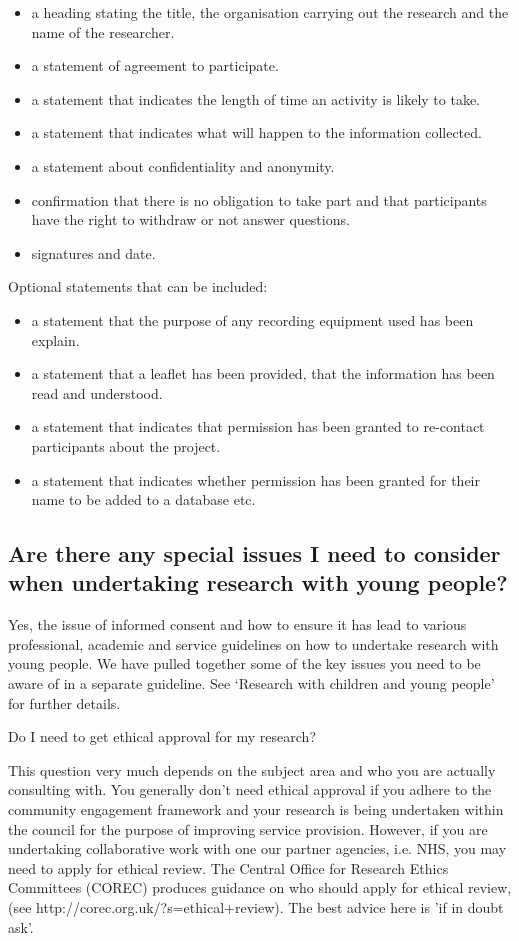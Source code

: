 \begin{itemize}
	\item a heading stating the title, the organisation carrying out the research and the name of the researcher.
	\item a statement of agreement to participate.
	\item a statement that indicates the length of time an activity is likely to take.
	\item a statement that indicates what will happen to the information collected.
	\item a statement about confidentiality and anonymity.
	\item confirmation that there is no obligation to take part and that participants have the right to withdraw or not answer questions.
	\item signatures and date.
\end{itemize}

Optional statements that can be included:

\begin{itemize}
	\item a statement that the purpose of any recording equipment used has been explain.
	\item a statement that a leaflet has been provided, that the information has been read and understood.
	\item a statement that indicates that permission has been granted to re-contact participants about the project.
	\item a statement that indicates whether permission has been granted for their name to be added to a database etc.
\end{itemize}

\subsection{Are there any special issues I need to consider when undertaking research with young people?}

Yes, the issue of informed consent and how to ensure it has lead to various professional, academic and service guidelines on how to undertake research with young people. We have pulled together some of the key issues you need to be aware of in a separate guideline. See ‘Research with children and young people’ for further details.

Do I need to get ethical approval for my research?

This question very much depends on the subject area and who you are actually consulting with. You generally don’t need ethical approval if you adhere to the community engagement framework and your research is being undertaken within the council for the purpose of improving service provision. However, if you are undertaking collaborative work with one our partner agencies, i.e. NHS, you may need to apply for ethical review. The Central Office for Research Ethics Committees (COREC) produces guidance on who should apply for ethical review, (see http://corec.org.uk/?s=ethical+review). The best advice here is 'if in doubt ask'.


